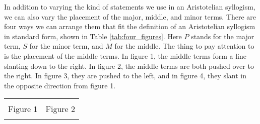 In addition to varying the kind of statements we use in an Aristotelian syllogism, we can also vary the placement of the major, middle, and minor terms. There are four ways we can arrange them that fit the definition of an Aristotelian syllogism in standard form, shown in Table \ref{tab:four_figures}. Here $P$ stands for the major term, $S$ for the minor term, and $M$ for the middle. The thing to pay attention to is the placement of the middle terms. In figure 1, the middle terms form a line slanting down to the right. In figure 2, the middle terms are both pushed over to the right. In figure 3, they are pushed to the left, and in figure 4, they slant in the opposite direction from figure 1.

\begin{table}[!ht]
\begin{tabu}{X[1,c] X[1,c]}
\begin{kormanize}
\end{kormanize}

&

\begin{kormanize}
\end{kormanize}

\\

\hspace{2em} Figure 1

&

\hspace{2em} Figure 2

\\

\begin{kormanize}
\end{kormanize}


\end{tabu}
\end{table}

